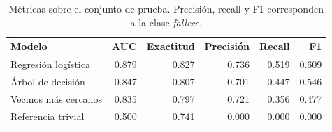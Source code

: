 \begin{table}[H]
\centering
\caption{Métricas sobre el conjunto de prueba. Precisión, recall y F1 corresponden a la clase \textit{fallece}.}
\label{tab:metricas}
\small
\begin{tabular}{p{3.6cm} r r r r r}
\toprule
\textbf{Modelo} & \textbf{AUC} & \textbf{Exactitud} & \textbf{Precisión} & \textbf{Recall} & \textbf{F1} \\
\midrule
Regresión logística & 0.879 & 0.827 & 0.736 & 0.519 & 0.609 \\
Árbol de decisión & 0.847 & 0.807 & 0.701 & 0.447 & 0.546 \\
Vecinos más cercanos & 0.835 & 0.797 & 0.721 & 0.356 & 0.477 \\
Referencia trivial & 0.500 & 0.741 & 0.000 & 0.000 & 0.000 \\
\bottomrule
\end{tabular}
\end{table}
